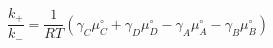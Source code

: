 \begin{equation}
\frac{k_+}{k_-}  = \frac{1}{RT}\left(\gamma_C\mu_C^\circ+ \gamma_D\mu_D^\circ -\gamma_A\mu_A^\circ-\gamma_B\mu_B^\circ\right)
\end{equation}
